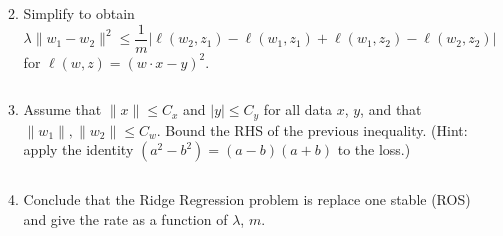 \documentclass[
10pt, %
a4paper, %
oneside, %
headinclude,footinclude, %
BCOR5mm, %
]{scrartcl}
\begin{document}
\begin{enumerate}
\begin{enumerate}
        \[\] %

        \item Simplify to obtain
        \[
        \lambda \|w_1 - w_2\|^2 \leq \frac{1}{m} | \ell(w_2, z_1) - \ell(w_1, z_1) + \ell(w_1, z_2) - \ell(w_2, z_2) |
        \]
        for $\ell(w, z) = (w \cdot x - y)^2$.

        \[\] %

        \item Assume that $\|x\| \leq C_x$ and $|y| \leq C_y$ for all data $x$, $y$, and that $\|w_1\|, \|w_2\| \leq C_w$. Bound the RHS of the previous inequality. (Hint: apply the identity $(a^2 - b^2) = (a - b)(a + b)$ to the loss.)

        \[\] %

        \item Conclude that the Ridge Regression problem is replace one stable (ROS) and give the rate as a function of $\lambda$, $m$.

        \[\] %
    \end{enumerate}

    \[\] %
\end{enumerate}


\end{document}
